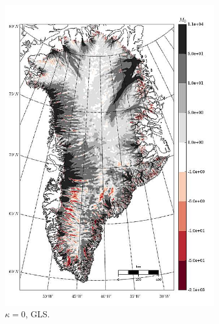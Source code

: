 
\begin{figure}
  
  \centering 

  \begin{subfigure}[b]{0.25\linewidth}
    \includegraphics[width=\linewidth]{images/balance_velocity/greenland/misfit_5H_kappa_0_GLS.jpg}
  \caption{$\kappa = 0$, GLS.}
  \label{greenland_bv_image_kappa_0_GLS_misfit}
  \end{subfigure}
  \begin{subfigure}[b]{0.25\linewidth}

\end{subfigure}
\end{figure}
